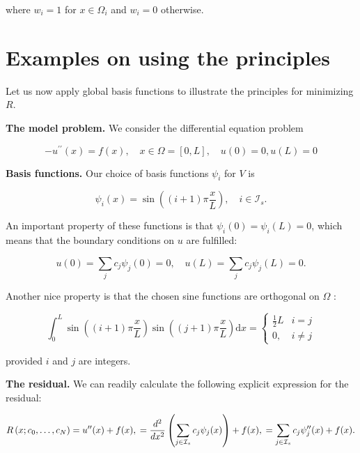 \documentclass[../main.tex]{subfiles}
\begin{document}
	\noindent where $w_{i}=1$ for $x \in \Omega_{i}$ and $w_{i}=0$ otherwise.

\section[Examples on using the principles]{Examples on using the principles} 
	\label{sec:sec_11_9}
	\noindent Let us now apply global basis functions to illustrate the principles for minimizing $R$.
	
	\noindent \textbf{The model problem.    } We consider the differential equation problem
	
	\begin{equation}
		\label{eqa146}
		-u^{\prime \prime}(x)=f(x), \quad x \in \Omega=[0, L], \quad u(0)=0, u(L)=0
	\end{equation}
	
	\noindent \textbf{Basis functions.   } Our choice of basis functions $\psi_{i}$ for $V$ is
	
	\begin{equation}
		\label{eqa147}
		\psi_{i}(x)=\sin \left((i+1) \pi \frac{x}{L}\right), \quad i \in \mathcal{I}_{s} .
	\end{equation}

	An important property of these functions is that $\psi_{i}(0)=\psi_{i}(L)=0$, which means that the boundary conditions on $u$ are fulfilled:
	
	$$ u(0)=\sum_{j} c_{j} \psi_{j}(0)=0, \quad u(L)=\sum_{j} c_{j} \psi_{j}(L)=0. $$
	
	\noindent Another nice property is that the chosen sine functions are orthogonal on $\Omega$ :
	
	\begin{equation}
		\label{eqa148}
		\int_{0}^{L} \sin \left((i+1) \pi \frac{x}{L}\right) \sin \left((j+1) \pi \frac{x}{L}\right) 	\mathrm{d} x= \begin{cases}\frac{1}{2} L & i=j \\ 0, & i \neq j\end{cases}
	\end{equation}

	\noindent provided $i$ and $j$ are integers.
	
	\noindent\textbf{The residual.   } We can readily calculate the following explicit expression for the residual:
	
	\begin{equation}
		\label{eqa149}
		R\left(x ; c_{0}, \ldots, c_{N}\right) =u^{\prime \prime}(x)+f(x), \\
		=\frac{d^{2}}{d x^{2}}\left(\sum_{j \in \mathcal{I}_{s}} c_{j} \psi_{j}(x)\right)+f(x), \\
		=\sum_{j \in \mathcal{I}_{s}} c_{j} \psi_{j}^{\prime \prime}(x)+f(x) .
	\end{equation}
	
\end{document}

